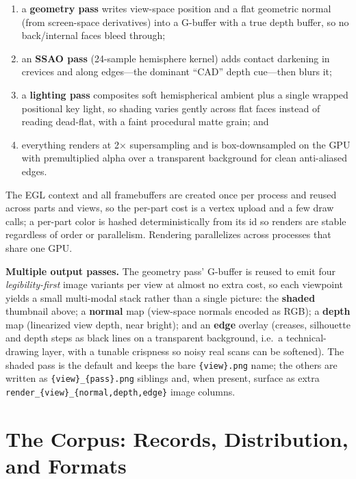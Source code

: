 \documentclass[11pt]{article}
\newcommand{\code}[1]{\texttt{#1}}
\begin{document}
\begin{enumerate}[label=(\arabic*)]
  \item a \textbf{geometry pass} writes view-space position and a flat geometric
        normal (from screen-space derivatives) into a G-buffer with a true depth
        buffer, so no back/internal faces bleed through;
  \item an \textbf{SSAO pass} (24-sample hemisphere kernel) adds contact darkening
        in crevices and along edges---the dominant ``CAD'' depth cue---then blurs it;
  \item a \textbf{lighting pass} composites soft hemispherical ambient plus a single
        wrapped positional key light, so shading varies gently across flat faces
        instead of reading dead-flat, with a faint procedural matte grain; and
  \item everything renders at \mbox{2$\times$} supersampling and is box-downsampled
        on the GPU with premultiplied alpha over a transparent background for clean
        anti-aliased edges.
\end{enumerate}

The EGL context and all framebuffers are created once per process and reused
across parts and views, so the per-part cost is a vertex upload and a few draw
calls; a per-part color is hashed deterministically from its id so renders are
stable regardless of order or parallelism. Rendering parallelizes across
processes that share one GPU.

\textbf{Multiple output passes.} The geometry pass' G-buffer is reused to emit
four \emph{legibility-first} image variants per view at almost no extra cost, so
each viewpoint yields a small multi-modal stack rather than a single picture:
the \textbf{shaded} thumbnail above; a \textbf{normal} map (view-space normals
encoded as RGB); a \textbf{depth} map (linearized view depth, near bright); and
an \textbf{edge} overlay (creases, silhouette and depth steps as black lines on
a transparent background, i.e.\ a technical-drawing layer, with a tunable
crispness so noisy real scans can be softened). The shaded pass is the default
and keeps the bare \code{\{view\}.png} name; the others are written as
\code{\{view\}\_\{pass\}.png} siblings and, when present, surface as extra
\code{render\_\{view\}\_\{normal,depth,edge\}} image columns.

\section{The Corpus: Records, Distribution, and Formats}\label{sec:corpus}
\end{document}
